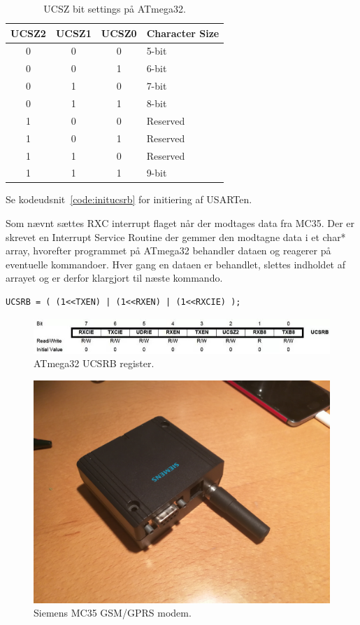 \begin{table}[h]
	\centering
	\begin{tabular}{|c|c|c|l|}
		\hline
		\rowcolor[HTML]{EFEFEF} 
		\textbf{UCSZ2} & \textbf{UCSZ1} & \textbf{UCSZ0} & \textbf{Character Size} \\ \hline
		0 & 0 & 0 & 5-bit \\ \hline
		0 & 0 & 1 & 6-bit \\ \hline
		0 & 1 & 0 & 7-bit \\ \hline
		0 & 1 & 1 & 8-bit \\ \hline
		1 & 0 & 0 & Reserved \\ \hline
		1 & 0 & 1 & Reserved \\ \hline
		1 & 1 & 0 & Reserved \\ \hline
		1 & 1 & 1 & 9-bit \\ \hline
	\end{tabular}
	\caption{UCSZ bit settings på ATmega32.}
	\label{fig:ucszbitsettings}
\end{table}

Se kodeudsnit~\ref{code:initucsrb} for initiering af USARTen. 

Som nævnt sættes RXC interrupt flaget når der modtages data fra MC35.
Der er skrevet en Interrupt Service Routine der gemmer den modtagne data i et char* array, hvorefter programmet på ATmega32 behandler dataen
og reagerer på eventuelle kommandoer. Hver gang en dataen er behandlet, slettes indholdet af arrayet og er derfor klargjort til næste 
kommando. 

\begin{lstlisting}[caption=Initiering af UCSRB,label=code:initucsrb] 
	UCSRB = ( (1<<TXEN) | (1<<RXEN) | (1<<RXCIE) );
\end{lstlisting}

\begin{figure}[h]
	\centering
	\includegraphics[width=\linewidth]{figs/avr_register_ucsrb.jpg}
	\caption{ATmega32 UCSRB register.}
	\label{fig:regucsrb}
\end{figure}


\begin{figure}[h]
	\centering
	\includegraphics[width=0.7\linewidth]{figs/device_gsm.jpg}
	\caption{Siemens MC35 GSM/GPRS modem.}
	\label{fig:devicegsm}
\end{figure}

